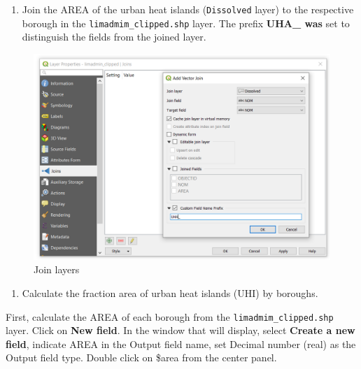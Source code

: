 \documentclass[]{book}
\providecommand{\tightlist}{%
  \setlength{\itemsep}{0pt}\setlength{\parskip}{0pt}}
\theoremstyle{definition}
\theoremstyle{definition}
\theoremstyle{definition}
\theoremstyle{remark}
\begin{document}
\begin{enumerate}
\def\labelenumi{\arabic{enumi}.}
\setcounter{enumi}{7}
\tightlist
\item
  Join the AREA of the urban heat islands (\texttt{Dissolved} layer) to
  the respective borough in the \texttt{limadmim\_clipped.shp} layer.
  The prefix \textbf{UHA\_ was} set to distinguish the fields from the
  joined layer.
\end{enumerate}

\begin{figure}

{\centering \includegraphics[width=14.26in]{figures/Join_UHA} 

}

\caption{Join layers}\label{fig:unnamed-chunk-35}
\end{figure}

\begin{enumerate}
\def\labelenumi{\arabic{enumi}.}
\setcounter{enumi}{8}
\tightlist
\item
  Calculate the fraction area of urban heat islands (UHI) by boroughs.
\end{enumerate}

First, calculate the AREA of each borough from the
\texttt{limadmim\_clipped.shp} layer. Click on \textbf{New field}. In
the window that will display, select \textbf{Create a new field},
indicate AREA in the Output field name, set Decimal number (real) as the
Output field type. Double click on \$area from the center panel.
\end{document}
